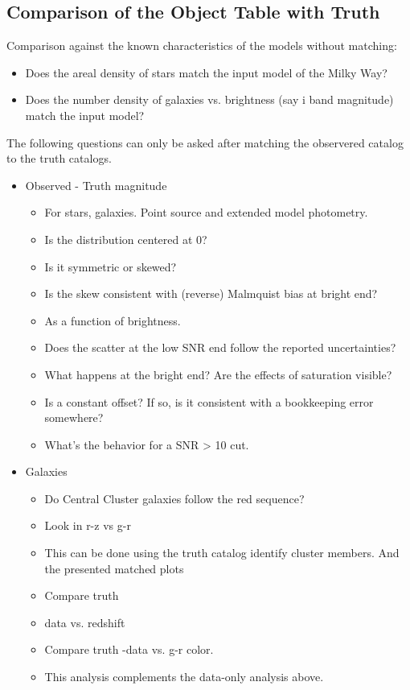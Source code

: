 \documentclass[11pt]{report}
\begin{document}
\begin{itemize}
\end{itemize}

\subsection{Comparison of the Object Table with Truth}

Comparison against the known characteristics of the models without matching:

\begin{itemize}
  \item Does the areal density of stars match the input model of the Milky Way?
  \item Does the number density of galaxies vs. brightness (say i band magnitude) match the input model?
\end{itemize}

The following questions can only be asked after matching the observered catalog to the truth catalogs.

\begin{itemize}
  \item Observed - Truth magnitude
  \begin{itemize}
      \item For stars, galaxies.  Point source and extended model photometry.
      \item Is the distribution centered at 0?
      \item Is it symmetric or skewed?
      \item Is the skew consistent with (reverse) Malmquist bias at bright end?
      \item As a function of brightness.
        \item Does the scatter at the low SNR end follow the reported uncertainties?
        \item What happens at the bright end? Are the effects of saturation visible?
      \item Is a constant offset?  If so, is it consistent with a bookkeeping error somewhere?
      \item What's the behavior for a SNR > 10 cut.
  \end{itemize}

  \item Galaxies
  \begin{itemize}
      \item Do Central Cluster galaxies follow the red sequence?
        \item Look in r-z vs g-r
        \item This can be done using the truth catalog identify cluster members.  And the presented matched plots
        \item Compare truth 
        \item data vs. redshift
        \item Compare truth -data vs. g-r color.
        \item This analysis complements the data-only analysis above.
    \end{itemize}
\end{itemize}
\end{document}

